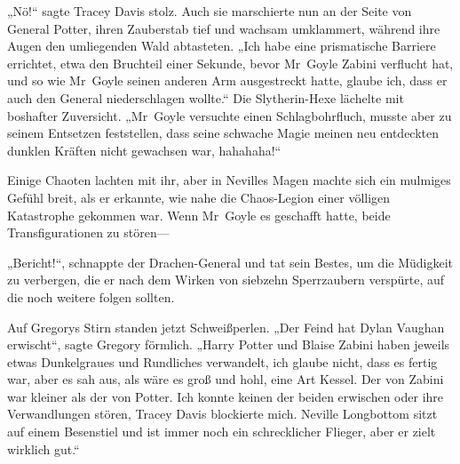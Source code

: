 „Nö!“ sagte Tracey Davis stolz. Auch sie marschierte nun an der Seite von General Potter, ihren Zauberstab tief und wachsam umklammert, während ihre Augen den umliegenden Wald abtasteten. „Ich habe eine prismatische Barriere errichtet, etwa den Bruchteil einer Sekunde, bevor Mr~Goyle Zabini verflucht hat, und so wie Mr~Goyle seinen anderen Arm ausgestreckt hatte, glaube ich, dass er auch den General niederschlagen wollte.“ Die Slytherin-Hexe lächelte mit boshafter Zuversicht. „Mr~Goyle versuchte einen Schlagbohrfluch, musste aber zu seinem Entsetzen feststellen, dass seine schwache Magie meinen neu entdeckten dunklen Kräften nicht gewachsen war, hahahaha!“

Einige Chaoten lachten mit ihr, aber in Nevilles Magen machte sich ein mulmiges Gefühl breit, als er erkannte, wie nahe die Chaos-Legion einer völligen Katastrophe gekommen war. Wenn Mr~Goyle es geschafft hatte, beide Transfigurationen zu stören—

\later

„Bericht!“, schnappte der Drachen-General und tat sein Bestes, um die Müdigkeit zu verbergen, die er nach dem Wirken von siebzehn Sperrzaubern verspürte, auf die noch weitere folgen sollten.

Auf Gregorys Stirn standen jetzt Schweißperlen. „Der Feind hat Dylan Vaughan erwischt“, sagte Gregory förmlich. „Harry Potter und Blaise Zabini haben jeweils etwas Dunkelgraues und Rundliches verwandelt, ich glaube nicht, dass es fertig war, aber es sah aus, als wäre es groß und hohl, eine Art Kessel. Der von Zabini war kleiner als der von Potter. Ich konnte keinen der beiden erwischen oder ihre Verwandlungen stören, Tracey Davis blockierte mich. Neville Longbottom sitzt auf einem Besenstiel und ist immer noch ein schrecklicher Flieger, aber er zielt wirklich gut.“

